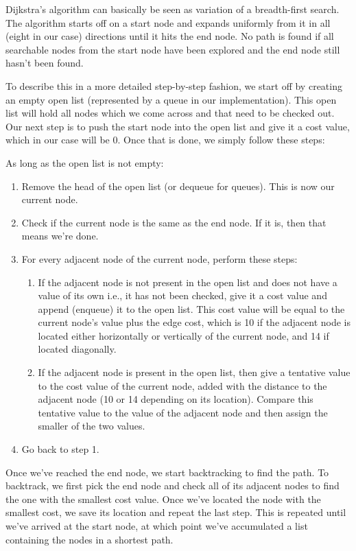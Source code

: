 \documentclass[12pt, a4paper]{article}
\begin{document}

Dijkstra's algorithm can basically be seen as variation of a breadth-first search. The algorithm starts off
on a start node and expands uniformly from it in all (eight in our case) directions until it hits
the end node. No path is found if all searchable nodes from the start node have been explored and
the end node still hasn't been found.

To describe this in a more detailed step-by-step fashion, we start off by creating an empty
open list (represented by a queue \cite{lecture28} in our implementation).
This open list will hold all nodes which we come across and that need to be checked out.
Our next step is to push the start node into the open list and give it a cost value, which
in our case will be 0. Once that is done, we simply follow these steps:

As long as the open list is not empty:

\begin{enumerate}
	\item Remove the head of the open list (or dequeue for queues). This is now
	our current node.
	\item Check if the current node is the same as the end node. If it is, then
	that means we're done.
	\item For every adjacent node of the current node, perform these steps:
	\begin{enumerate}
		\item If the adjacent node is not present in the open list and does not
		have a value of its own i.e., it has not been checked, give it a cost
		value and append (enqueue) it to the open list. This cost value will be
		equal to the current node's value plus the edge cost, which is 10 if the
		adjacent node is located either horizontally or vertically of the current
		node, and 14 if located diagonally.
		\item If the adjacent node is present in the open list, then give a
		tentative value to the cost value of the current node, added with the
		distance to the adjacent node (10 or 14 depending on its location).
		Compare this tentative value to the value of the adjacent node and then
		assign the smaller of the two values.
	\end{enumerate}
	\item Go back to step 1.
\end{enumerate}

Once we've reached the end node, we start backtracking to find the path. To backtrack, we first
pick the end node and check all of its adjacent nodes to find the one with the smallest cost value. Once we've
located the node with the smallest cost, we save its location and repeat the last step. This is repeated until we've arrived
at the start node, at which point we've accumulated a list containing the nodes in a shortest path.
\end{document}
